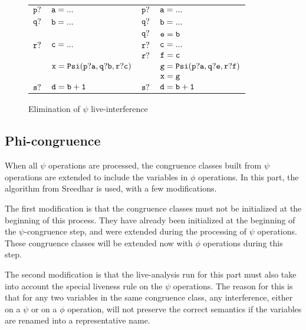 \begin{figure}
\begin{center}
\footnotesize
\begin{tabular}{llll}
${\tt p?}$ & ${\tt a = ...}$ & ${\tt p?}$ & ${\tt a = ...}$ \\
${\tt q?}$ & ${\tt b = ...}$ & ${\tt q?}$ & ${\tt b = ...}$ \\
           &                 & ${\tt q?}$ & ${\tt e = b}$ \\
${\tt r?}$ & ${\tt c = ...}$ & ${\tt r?}$ & ${\tt c = ...}$ \\
           &                 & ${\tt r?}$ & ${\tt f = c}$ \\
           & ${\tt x = Psi(p?a,q?b,r?c)}$ & & ${\tt g = Psi(p?a,q?e,r?f)}$ \\
           &                 &            & ${\tt x = g}$ \\
${\tt s?}$ & ${\tt d = b+1}$ & ${\tt s?}$ & ${\tt d = b+1}$ \\
\end{tabular}
\caption{Elimination of $\psi$ live-interference}
\label{fig:live-interference}
\end{center}
\end{figure}

\subsection{Phi-congruence}

When all $\psi$ operations are processed, the congruence classes built
from $\psi$ operations are extended to include the variables in $\phi$
operations. In this part, the algorithm from Sreedhar is used, with a few
modifications.

The first modification is that the congruence classes must not be
initialized at the beginning of this process. They have already been
initialized at the beginning of the $\psi$-congruence step, and were
extended during the processing of $\psi$ operations. These congruence
classes will be extended now with $\phi$ operations during this step.

The second modification is that the live-analysis run for this part
must also take into account the special liveness rule on the $\psi$
operations. The reason for this is that for any two variables in the
same congruence class, any interference, either on a $\psi$ or on a
$\phi$ operation, will not preserve the correct semantics if the
variables are renamed into a representative name.

